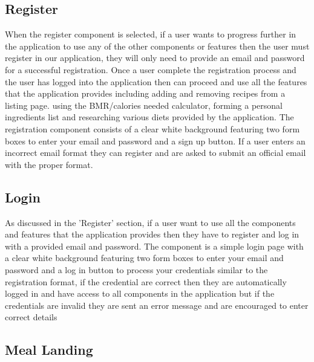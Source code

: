 \subsection{Register}

When the register component is selected, if a user wants to progress further in the application to use any of the other components or features then the user must register in our application, they will only need to provide an email and password for a successful registration. Once a user complete the registration process and the user has logged into the application then can proceed and use all the features that the application provides including adding and removing recipes from a listing page. using the BMR/calories needed calculator, forming a personal ingredients list and researching various diets provided by the application. The registration component consists of a clear white background featuring two form boxes to enter your email and password and a sign up button. If a user enters an incorrect email format they can register and are asked to submit an official email with the proper format.

\subsection{Login}

As discussed in the 'Register' section, if a user want to use all the components and features that the application provides then they have to register and log in with a provided email and password. The component is a simple login page with a clear white background featuring two form boxes to enter your email and password and a log in button to process your credentials similar to the registration format, if the credential are correct then they are automatically logged in and have access to all components in the application but if the credentials are invalid they are sent an error message and are encouraged to enter correct details 

\subsection{Meal Landing}

